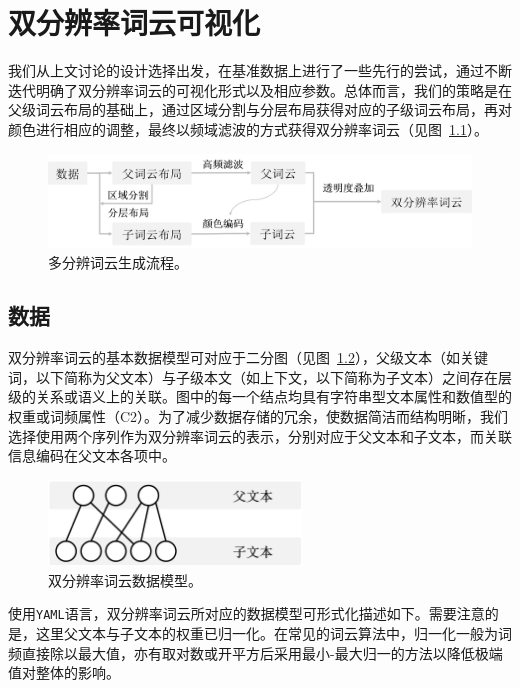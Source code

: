 \chapter{双分辨率词云可视化}
\label{sec:refinement}

我们从上文讨论的设计选择出发，在基准数据上进行了一些先行的尝试，通过不断迭代明确了双分辨率词云的可视化形式以及相应参数。总体而言，我们的策略是在父级词云布局的基础上，通过区域分割与分层布局获得对应的子级词云布局，再对颜色进行相应的调整，最终以频域滤波的方式获得双分辨率词云（见图~\ref{fig:pipeline}）。
\begin{figure}[htbp]
	\centering
	\includegraphics[width=\textwidth]{figures/pipeline.png}
	\caption{多分辨词云生成流程。}
	\label{fig:pipeline}
\end{figure}
\vspace{-1.2cm}

\section{数据}
双分辨率词云的基本数据模型可对应于二分图（见图~\ref{fig:data_model}），父级文本（如关键词，以下简称为父文本）与子级本文（如上下文，以下简称为子文本）之间存在层级的关系或语义上的关联。图中的每一个结点均具有字符串型文本属性和数值型的权重或词频属性（C2）。为了减少数据存储的冗余，使数据简洁而结构明晰，我们选择使用两个序列作为双分辨率词云的表示，分别对应于父文本和子文本，而关联信息编码在父文本各项中。
\begin{figure}[htbp]
	\centering
	\includegraphics[width=0.6\textwidth]{figures/data_model.png}
	\caption{双分辨率词云数据模型。}
	\label{fig:data_model}
\end{figure}


使用\texttt{YAML}语言，双分辨率词云所对应的数据模型可形式化描述如下。需要注意的是，这里父文本与子文本的权重已归一化。在常见的词云算法中，归一化一般为词频直接除以最大值，亦有取对数或开平方后采用最小-最大归一的方法以降低极端值对整体的影响。

